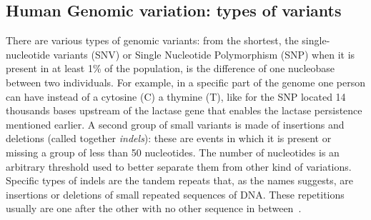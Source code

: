 \subsection{Human Genomic variation: types of variants}
There are various types of genomic variants: from the shortest, the single-nucleotide variants (SNV) or Single Nucleotide Polymorphism (SNP) when it is present in at least 1\% of the population, is the difference of one nucleobase between two individuals. For example, in a specific part of the genome one person can have instead of a cytosine (C) a thymine (T), like for the SNP located 14 thousands bases upstream of the lactase gene that enables the lactase persistence mentioned earlier\cite{lactase_persistance}.
A second group of small variants is made of insertions and deletions (called together \emph{indels}): these are events in which it is present or missing a group of less than 50 nucleotides. The number of nucleotides is an arbitrary threshold used to better separate them from other kind of variations. Specific types of indels are the tandem repeats that, as the names suggests, are insertions or deletions of small repeated sequences of DNA. These repetitions usually are one after the other with no other sequence in between~\cite{nih_variation}.\\
